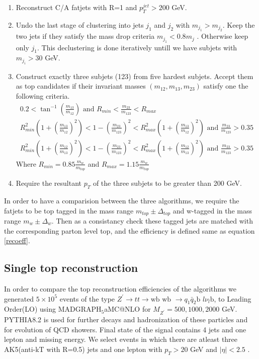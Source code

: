 \documentclass[12pt,a4paper]{article}		%
\begin{document}
\begin{enumerate}
	\item Reconstruct C/A fatjets with R=1 and $p_T^{jet} > 200$ GeV. 
	\item Undo the last stage of clustering into jets $j_1$ and $j_2$ with $m_{j_1} > m_{j_2}$. Keep the two jets if they satisfy the mass drop criteria $m_{j_1} < 0.8 m_j$ . Otherwise keep only $j_1$. This declustering is done iteratively untill we have subjets with $m_{j_i} > 30$ GeV.
	\item Construct exactly three subjets (123) from five hardest subjets. Accept them as top candidates if their invariant masses $(m_{12}, m_{13}, m_{23})$ satisfy one the following criteria. 
	\begin{eqnarray*}	
	0.2 < \tan^{-1} \left(\frac{m_{13}}{m_{12}} \right) \text{  and } R_{min} < \frac{m_{23}}{m_{123}} < R_{max} \\
	R_{min}^2 \left( 1 + \left( \frac{m_{13}}{m_{12}} \right)^2 \right) < 1 - \left(\frac{m_{23}}{m_{123}} \right)^2 < R_{max}^2 \left( 1 + \left( \frac{m_{13}}{m_{12}} \right)^2 \right) \text{  and } \frac{m_{23}}{m_{123}} > 0.35\\
	R_{min}^2 \left( 1 + \left( \frac{m_{12}}{m_{13}} \right)^2 \right) < 1 - \left(\frac{m_{23}}{m_{123}} \right)^2 < R_{max}^2 \left( 1 + \left( \frac{m_{12}}{m_{13}} \right)^2 \right) \text{  and } \frac{m_{23}}{m_{123}} > 0.35
	\end{eqnarray*}
	Where $R_{min} = 0.85 \frac{m_w}{m_{top}}$ and $R_{max} = 1.15 \frac{m_w}{m_{top}}$ 
	\item Require the resultant $p_T$ of the three subjets to be greater than 200 GeV.
\end{enumerate}

In order to have a comparision between the three algorithms, we require the fatjets to be top tagged in the mass range $m_{top} \pm \Delta_{top}$ and w-tagged in the mass range $m_{w} \pm \Delta_{w}$. Then as a consistancy check these tagged jets are matched with the corresponding parton level top, and the efficiency is defined same as equation \ref{recoeff}.
     

\subsection{Single top reconstruction}

In order to compare the top reconstruction efficiencies of the algorithms we generated $5 \times 10^5$ events of the type  $Z^\prime \to t t \to \text{wb wb } \to q_1 \bar{q}_2\text{b }l \nu_l\text{b}$, to Leading Order(LO) using $\text{MADGRAPH}_5$aMC@NLO \cite{mad1,mad2} for $M_{Z^\prime} = 500,1000,2000$ GeV. PYTHIA8.2 \cite{pythia} is used for further decays and hadronization  of these particles and for evolution of QCD showers. Final state of the signal contains 4 jets and one lepton and missing energy. We select events in which there are atleast three AK5(anti-kT with R=0.5) jets and one lepton with $p_T > 20$ GeV and $|\eta| < 2.5$ .    
\end{document}
